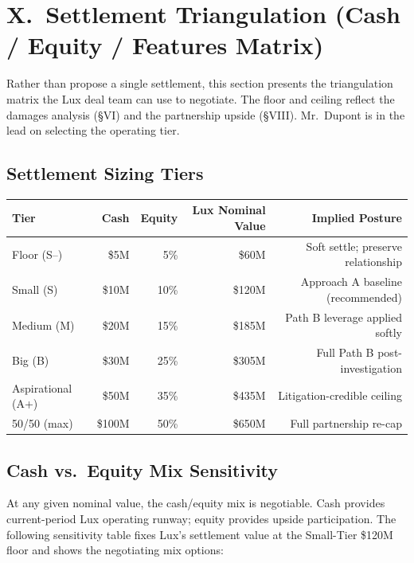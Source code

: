 \documentclass[11pt,letterpaper]{article}
\begin{document}
\section*{X.\ Settlement Triangulation (Cash / Equity / Features Matrix)}

Rather than propose a single settlement, this section presents the
triangulation matrix the Lux deal team can use to negotiate. The
floor and ceiling reflect the damages analysis (\S VI) and the
partnership upside (\S VIII). Mr.\ Dupont is in the lead on selecting
the operating tier.

\subsection*{Settlement Sizing Tiers}

\begin{center}
\begin{small}
\begin{tabular}{lrrrr}
\toprule
\textbf{Tier} & \textbf{Cash} & \textbf{Equity} & \textbf{Lux Nominal Value} & \textbf{Implied Posture} \\
\midrule
Floor (S--)       & \$5M   & 5\%   & \$60M   & Soft settle; preserve relationship \\
Small (S)         & \$10M  & 10\%  & \$120M  & Approach A baseline (recommended) \\
Medium (M)        & \$20M  & 15\%  & \$185M  & Path B leverage applied softly \\
Big (B)           & \$30M  & 25\%  & \$305M  & Full Path B post-investigation \\
Aspirational (A+) & \$50M  & 35\%  & \$435M  & Litigation-credible ceiling \\
50/50 (max)       & \$100M & 50\%  & \$650M  & Full partnership re-cap \\
\bottomrule
\end{tabular}
\end{small}
\end{center}

\subsection*{Cash vs.\ Equity Mix Sensitivity}

At any given nominal value, the cash/equity mix is negotiable. Cash
provides current-period Lux operating runway; equity provides upside
participation. The following sensitivity table fixes Lux's settlement
value at the Small-Tier \$120M floor and shows the negotiating mix
options:
\end{document}
